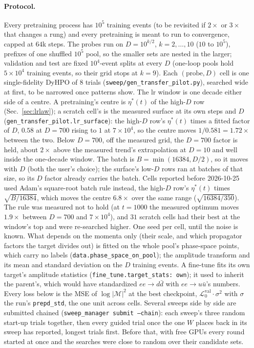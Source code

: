 \documentclass[11pt]{article}
\newcommand{\vlnr}{\mathcal{L}^{\mathrm{val}}_{0}}   %
\newcommand{\code}[1]{\texttt{#1}}
\begin{document}
\paragraph{Protocol.} Every pretraining process has $10^5$ training events (to be revisited if
$2\times$ or $3\times$ that changes a rung) and every pretraining is meant to run to convergence, capped at $64$k steps. The
probes run on $D=10^{k/2}$, $k=2,\dots,10$ ($10$ to $10^5$), prefixes of one shuffled $10^5$
pool, so the smaller sets are nested in the larger; validation and test are fixed $10^4$-event
splits at every $D$ (one-loop pools hold $5\times10^4$ training events, so their grid stops at
$k=9$). Each $(\text{probe},D)$ cell is one single-fidelity DyHPO of $8$ trials
(\code{sweep/gen\_transfer\_pilot.py}), searched wide at first, to be narrowed once
patterns show. The lr window is one decade either side of a centre. A pretraining's centre is $\eta^\ast(t)$ of the
high-$D$ row (Sec.~\ref{sec:lrlaw}); a scratch cell's is the measured surface at its own steps and $D$
(\code{gen\_transfer\_pilot.lr\_surface}): the high-$D$ row's $\eta^\ast(t)$ times a fitted factor of $D$, $0.58$ at
$D=700$ rising to $1$ at $7\times10^4$, so the centre moves $1/0.581=1.72\times$ between the two. Below $D=700$, off the
measured grid, the $D=700$ factor is held, about $2\times$ above the measured trend's extrapolation at $D=10$ and well
inside the one-decade window. The batch is $B=\min(16384,D/2)$, so it moves with $D$ (both the user's choice); the
surface's low-$D$ rows ran at batches of that size, so its $D$ factor already carries the batch. Cells reported before
2026-10-25 used Adam's square-root batch rule instead, the high-$D$ row's $\eta^\ast(t)$ times $\sqrt{B/16384}$, which
moves the centre $6.8\times$ over the same range ($\sqrt{16384/350}$). The rule was measured not to hold (at $t=1000$ the
measured optimum moves $1.9\times$ between $D=700$ and $7\times10^4$), and $31$ scratch cells had their best at the
window's top and were re-searched higher. One seed per
cell, until the noise is known. What depends on the momenta only (their scale, and which
propagator factors the target divides out) is fitted on the whole pool's phase-space points,
which carry no labels (\code{data.phase\_space\_on\_pool}); the amplitude transform and its
mean and standard deviation on the $D$ training events. A fine-tune fits its own target's
amplitude statistics (\code{fine\_tune.target\_stats: own}); it used to inherit the parent's,
which would have standardized $ee\to d\bar d$ with $ee\to u\bar u$'s numbers. Every loss below
is the MSE of $\log|\mathcal M|^2$ at the best checkpoint, $\vlnr\cdot\sigma^2$ with $\sigma$
the run's \code{prepd\_std}, the one unit across cells. Several sweeps side by side are
submitted chained (\code{sweep\_manager submit --chain}): each sweep's three random start-up
trials together, then every guided trial once the one $W$ places back in its sweep has
reported, longest trials first. Before that, with free GPUs every round started at once and the
searches were close to random over their candidate sets.
\end{document}
